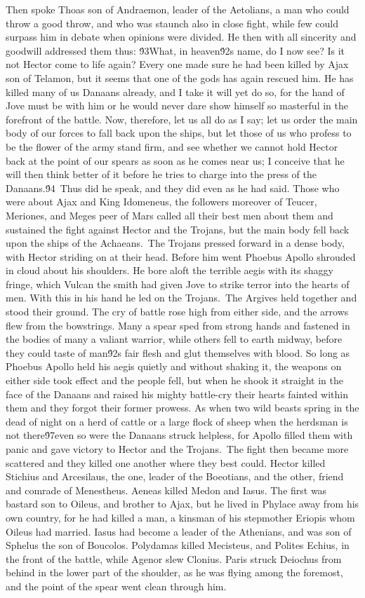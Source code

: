 {Then spoke Thoas son of Andraemon, leader of the Aetolians, a man who could throw a good throw, and who was staunch also in close fight, while few could surpass him in debate when opinions were divided. He then with all sincerity and goodwill addressed them thus: \'93What, in heaven\'92s name, do I now see? Is it not Hector come to life again? Every one made sure he had been killed by Ajax son of Telamon, but it seems that one of the gods has again rescued him. He has killed many of us Danaans already, and I take it will yet do so, for the hand of Jove must be with him or he would never dare show himself so masterful in the forefront of the battle. Now, therefore, let us all do as I say; let us order the main body of our forces to fall back upon the ships, but let those of us who profess to be the flower of the army stand firm, and see whether we cannot hold Hector back at the point of our spears as soon as he comes near us; I conceive that he will then think better of it before he tries to charge into the press of the Danaans.\'94\
Thus did he speak, and they did even as he had said. Those who were about Ajax and King Idomeneus, the followers moreover of Teucer, Meriones, and Meges peer of Mars called all their best men about them and sustained the fight against Hector and the Trojans, but the main body fell back upon the ships of the Achaeans.\
The Trojans pressed forward in a dense body, with Hector striding on at their head. Before him went Phoebus Apollo shrouded in cloud about his shoulders. He bore aloft the terrible aegis with its shaggy fringe, which Vulcan the smith had given Jove to strike terror into the hearts of men. With this in his hand he led on the Trojans.\
The Argives held together and stood their ground. The cry of battle rose high from either side, and the arrows flew from the bowstrings. Many a spear sped from strong hands and fastened in the bodies of many a valiant warrior, while others fell to earth midway, before they could taste of man\'92s fair flesh and glut themselves with blood. So long as Phoebus Apollo held his aegis quietly and without shaking it, the weapons on either side took effect and the people fell, but when he shook it straight in the face of the Danaans and raised his mighty battle-cry their hearts fainted within them and they forgot their former prowess. As when two wild beasts spring in the dead of night on a herd of cattle or a large flock of sheep when the herdsman is not there\'97even so were the Danaans struck helpless, for Apollo filled them with panic and gave victory to Hector and the Trojans.\
The fight then became more scattered and they killed one another where they best could. Hector killed Stichius and Arcesilaus, the one, leader of the Boeotians, and the other, friend and comrade of Menestheus. Aeneas killed Medon and Iasus. The first was bastard son to Oileus, and brother to Ajax, but he lived in Phylace away from his own country, for he had killed a man, a kinsman of his stepmother Eriopis whom Oileus had married. Iasus had become a leader of the Athenians, and was son of Sphelus the son of Boucolos. Polydamas killed Mecisteus, and Polites Echius, in the front of the battle, while Agenor slew Clonius. Paris struck Deiochus from behind in the lower part of the shoulder, as he was flying among the foremost, and the point of the spear went clean through him.\
}
